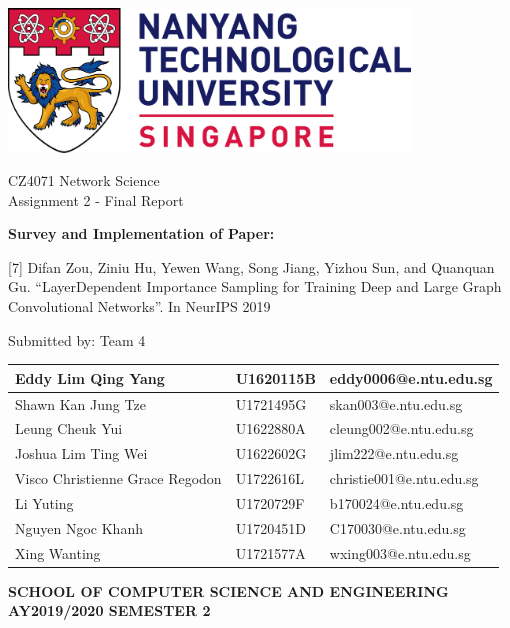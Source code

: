 \begin{titlepage}
\begin{center}

\includegraphics[width=0.8\textwidth]{assets/ntu_logo.png}

\vspace{2cm}

{\large CZ4071 Network Science}
\\[0.5cm]
{\large Assignment 2 - Final Report}

\vspace{2.5cm}

\textbf{\large Survey and Implementation of Paper: }

\vspace{0.5cm}

[7] Difan Zou, Ziniu Hu, Yewen Wang, Song Jiang, Yizhou Sun, and Quanquan Gu. “LayerDependent Importance Sampling for Training Deep and Large Graph Convolutional
Networks”. In NeurIPS 2019


\vspace{2.5cm}

Submitted by:
Team 4
\begin{table}[!htbp]
\centering
\begin{tabular}{|l|l|l|}
\hline
Eddy Lim Qing Yang & U1620115B & eddy0006@e.ntu.edu.sg \\ \hline
Shawn Kan Jung Tze& U1721495G & skan003@e.ntu.edu.sg \\ \hline
Leung Cheuk Yui & U1622880A & cleung002@e.ntu.edu.sg \\ \hline
Joshua Lim Ting Wei & U1622602G & jlim222@e.ntu.edu.sg \\ \hline
Visco Christienne Grace Regodon & U1722616L & christie001@e.ntu.edu.sg \\ \hline
Li Yuting & U1720729F & b170024@e.ntu.edu.sg \\ \hline
Nguyen Ngoc Khanh& U1720451D & C170030@e.ntu.edu.sg \\ \hline
Xing Wanting & U1721577A & wxing003@e.ntu.edu.sg \\ \hline
\end{tabular}
\end{table}

\vfill

\bfseries SCHOOL OF COMPUTER SCIENCE AND ENGINEERING
\\
AY2019/2020 SEMESTER 2

\end{center}
\end{titlepage}